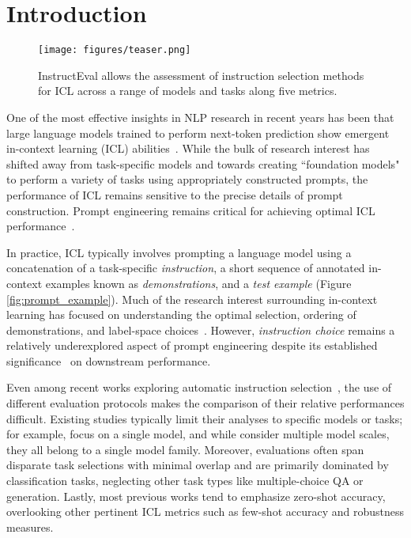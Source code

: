 \section{Introduction}

\begin{figure}[t]
    \centering
    \texttt{[image: figures/teaser.png]}
    \caption{
        InstructEval allows the assessment of instruction selection methods for ICL across a range of models and tasks along five metrics.
     }
    \label{fig:teaser}
\end{figure}


One of the most effective insights in NLP research in recent years has been that large language models trained to perform next-token prediction show emergent in-context learning (ICL) abilities~\cite{brown2020language, Scao2022BLOOMA1, Zhang2022OPTOP}.
While the bulk of research interest has shifted away from task-specific models and towards creating ``foundation models" to perform a variety of tasks using appropriately constructed prompts, the performance of ICL remains sensitive to the precise details of prompt construction. Prompt engineering remains critical for achieving optimal ICL performance~\cite{perez2021true, zhao2021calibrate, webson-pavlick-2022-prompt}.

In practice, ICL typically involves prompting a language model using a concatenation of a task-specific \textit{instruction}, a short sequence of annotated in-context examples known as \textit{demonstrations}, and a \textit{test example} (Figure \ref{fig:prompt_example}).
Much of the research interest surrounding in-context learning has focused on understanding the optimal selection, ordering of demonstrations, and label-space choices~\cite{Liu2021WhatMG, Su2022SelectiveAM, rubin2022learning, Wang2023LargeLM, lu2021fantastically, Wei2023LargerLM, Pan2023WhatIL}. However, \emph{instruction choice} remains a relatively underexplored aspect of prompt engineering despite its established significance~\cite{mishra-etal-2022-cross} on downstream performance.

Even among recent works exploring automatic instruction selection~\cite{honovich2022instruction, lowperplexityprompts, rlprompt, ape}, the use of different evaluation protocols makes the comparison of their relative performances difficult. Existing studies typically limit their analyses to specific models or tasks; for example, \citet{ape} focus on a single model, and while \citet{rlprompt} consider multiple model scales, they all belong to a single model family. Moreover, evaluations often span disparate task selections with minimal overlap and are primarily dominated by classification tasks, neglecting other task types like multiple-choice QA or generation. Lastly, most previous works tend to emphasize zero-shot accuracy, overlooking other pertinent ICL metrics such as few-shot accuracy and robustness measures.

